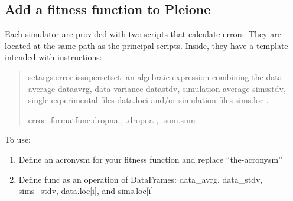\documentclass[letterpaper,10pt,english]{sphinxmanual}
\begin{document}
\subsection{Add a fitness function to Pleione}
\label{\detokenize{functions/addFitness:add-a-fitness-function-to-pleione}}\label{\detokenize{functions/addFitness::doc}}
Each simulator are provided with two scripts that calculate errors. They are
located at the same path as the principal scripts. Inside, they have a template
intended with instructions:
\begin{quote}

%
\begin{sphinxVerbatim}[commandchars=\\\{\}]
 setargs.error.issupersetset\PYG{o}{[}\PYG{o}{]}:
          
          an algebraic expression combining the data average data\PYGZus{}avrg, data variance data\PYGZus{}stdv, simulation average sims\PYGZus{}stdv,
        single experimental files data.loc\PYG{o}{[}i\PYG{o}{]} and/or simulation files sims.loc\PYG{o}{[}i\PYG{o}{]}.

        error\PYG{o}{[}\PYG{o}{]}  .formatfunc.dropna  ,   .dropna  ,   .sum.sum
\end{sphinxVerbatim}
\end{quote}

To use:
\begin{enumerate}
\def\theenumi{\arabic{enumi}}
\def\labelenumi{\theenumi )}
\makeatletter\def\p@enumii{\p@enumi \theenumi )}\makeatother
\item {} 
Define an acronysm for your fitness function and replace “the-acronysm”

\item {} 
Define func as an operation of DataFrames: data\_avrg, data\_stdv, sims\_stdv, data.loc{[}i{]}, and sims.loc{[}i{]}

\end{enumerate}
\end{document}
